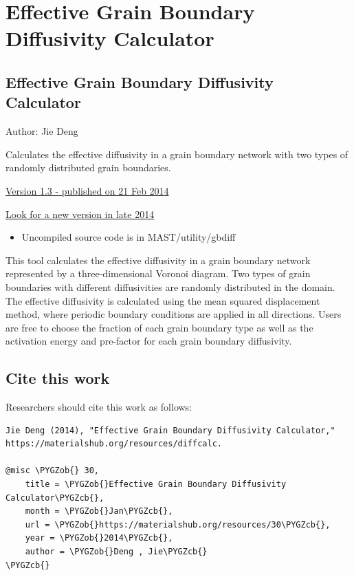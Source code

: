 \documentclass[letterpaper,10pt,english]{sphinxmanual}
\def\PYGZob{\char`\{}
\def\PYGZcb{\char`\}}
\begin{document}
\section{Effective Grain Boundary Diffusivity Calculator}
\label{8_0_standalonetools:effective-grain-boundary-diffusivity-calculator}

\subsection{Effective Grain Boundary Diffusivity Calculator}
\label{8_0_2_gbdiff:effective-grain-boundary-diffusivity-calculator}\label{8_0_2_gbdiff::doc}
Author: Jie Deng

Calculates the effective diffusivity in a grain boundary network with two types of randomly distributed grain boundaries.

\href{https://materialshub.org/resources/diffcalc}{Version 1.3 - published on 21 Feb 2014}

\href{https://materialshub.org/resources/gbdiff}{Look for a new version in late 2014}
\begin{itemize}
\item {} 
Uncompiled source code is in MAST/utility/gbdiff

\end{itemize}

This tool calculates the effective diffusivity in a grain boundary network represented by a three-dimensional Voronoi diagram.
Two types of grain boundaries with different diffusivities are randomly distributed in the domain.
The effective diffusivity is calculated using the mean squared displacement method, where periodic boundary conditions are applied in all directions.
Users are free to choose the fraction of each grain boundary type as well as the activation energy and pre-factor for each grain boundary diffusivity.


\subsection{Cite this work}
\label{8_0_2_gbdiff:cite-this-work}
Researchers should cite this work as follows:

\begin{Verbatim}[commandchars=\\\{\}]
Jie Deng (2014), "Effective Grain Boundary Diffusivity Calculator," https://materialshub.org/resources/diffcalc.

@misc \PYGZob{} 30,
    title = \PYGZob{}Effective Grain Boundary Diffusivity Calculator\PYGZcb{},
    month = \PYGZob{}Jan\PYGZcb{},
    url = \PYGZob{}https://materialshub.org/resources/30\PYGZcb{},
    year = \PYGZob{}2014\PYGZcb{},
    author = \PYGZob{}Deng , Jie\PYGZcb{}
\PYGZcb{}
\end{Verbatim}
\end{document}
